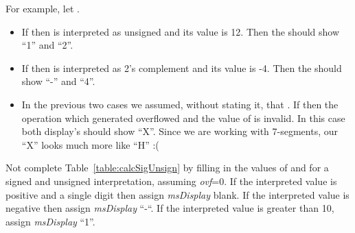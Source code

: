For example, let . 
\begin{itemize}
\item 
If  then
 is interpreted as unsigned and its value is 12. Then
the  should show ``1'' and  ``2''. 

\item 
If  then
 is interpreted as 2's complement and its value is -4. Then
the  should show ``-'' and  ``4''. 

\item 
In the previous two cases we assumed, without stating it, that .
If  then the operation which generated  overflowed
and the value of  is invalid.  In this case both display's should show ``X''.
Since we are working with 7-segments, our ``X'' looks much more like ``H'' :(
\end{itemize}

Not complete Table~\ref{table:calcSigUnsign} by filling in the values of  and
 for a signed and unsigned interpretation, assuming
\emph{ovf}=0. If the interpreted value is
positive and a single digit then assign \emph{msDisplay} blank. If the
interpreted value is negative then assign \emph{msDisplay} ``-``. If the
interpreted value is greater than 10, assign \emph{msDisplay} ``1''.


